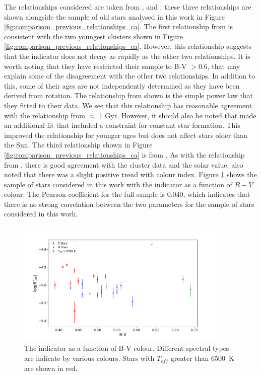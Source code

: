 The relationships considered are taken from \citet{Soderblom_etal_1991}, \citet{Lachaume_etal_1999} and \citet{Mamajek_Hillenbrand_2008}; these three relationships are shown alongside the sample of old stars analysed in this work in Figure \ref{fig:comparison_previous_relationships_ca}. The first relationship from \citet{Lachaume_etal_1999} is consistent with the two youngest clusters shown in Figure \ref{fig:comparison_previous_relationships_ca}. However, this relationship suggests that the \Rprime indicator does not decay as rapidly as the other two relationships. It is worth noting that they have restricted their sample to B-V $> 0.6$, that may explain some of the disagreement with the other two relationships. In addition to this, some of their ages are not independently determined as they have been derived from rotation. The relationship from \citet{Soderblom_etal_1991} shown is the simple power law that they fitted to their data. We see that this relationship has reasonable agreement with the \citet{Mamajek_Hillenbrand_2008} relationship from $\approx$ 1 Gyr. However, it should also be noted that \citet{Soderblom_etal_1991} made an additional fit that included a constraint for constant star formation. This improved the relationship for younger ages but does not affect stars older than the Sun. The third relationship shown in Figure \ref{fig:comparison_previous_relationships_ca} is from \citet{Mamajek_Hillenbrand_2008}. As with the relationship from \citet{Soderblom_etal_1991}, there is good agreement with the cluster data and the solar value. \citet{Mamajek_Hillenbrand_2008} also noted that there was a slight positive trend with colour index. Figure \ref{fig:ca_v_bv} shows the sample of stars considered in this work with the \Rprime indicator as a function of $B-V$ colour. The Pearson coefficient for the full sample is $0.040$, which indicates that there is no strong correlation between the two parameters for the sample of stars considered in this work.

\begin{figure}
    \centering
    \includegraphics[width=0.9\textwidth]{Figures/4-Chromospheric_age/all_ca_results_vs_bv.pdf}
    \caption[\Rprime as a function of B-V colour]{The \Rprime indicator as a function of B-V colour. Different spectral types are indicate by various colours. Stars with $T_{eff}$ greater than 6500~K are shown in red.}
    \label{fig:ca_v_bv}
\end{figure}

